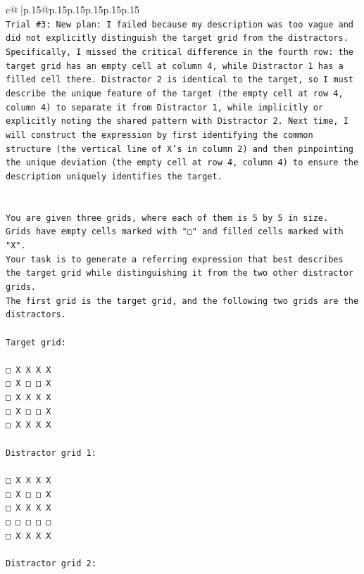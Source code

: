 \documentclass{article}
\begin{document}
{\begin{supertabular}{c@{$\;$}|p{.15\linewidth}@{}p{.15\linewidth}p{.15\linewidth}p{.15\linewidth}p{.15\linewidth}p{.15\linewidth}}
{{{\\ 
\texttt{Trial \#3: New plan: I failed because my description was too vague and did not explicitly distinguish the target grid from the distractors. Specifically, I missed the critical difference in the fourth row: the target grid has an empty cell at column 4, while Distractor 1 has a filled cell there. Distractor 2 is identical to the target, so I must describe the unique feature of the target (the empty cell at row 4, column 4) to separate it from Distractor 1, while implicitly or explicitly noting the shared pattern with Distractor 2. Next time, I will construct the expression by first identifying the common structure (the vertical line of X's in column 2) and then pinpointing the unique deviation (the empty cell at row 4, column 4) to ensure the description uniquely identifies the target.} \\
\\ 
\\ 
\texttt{You are given three grids, where each of them is 5 by 5 in size.} \\
\texttt{Grids have empty cells marked with "▢" and filled cells marked with "X".} \\
\texttt{Your task is to generate a referring expression that best describes the target grid while distinguishing it from the two other distractor grids.} \\
\texttt{The first grid is the target grid, and the following two grids are the distractors.} \\
\\ 
\texttt{Target grid:} \\
\\ 
\texttt{□ X X X X} \\
\texttt{□ X □ □ X} \\
\texttt{□ X X X X} \\
\texttt{□ X □ □ X} \\
\texttt{□ X X X X} \\
\\ 
\texttt{Distractor grid 1:} \\
\\ 
\texttt{□ X X X X} \\
\texttt{□ X □ □ X} \\
\texttt{□ X X X X} \\
\texttt{□ □ □ □ □} \\
\texttt{□ X X X X} \\
\\ 
\texttt{Distractor grid 2:} \\
}}}
\end{supertabular}}
\end{document}
